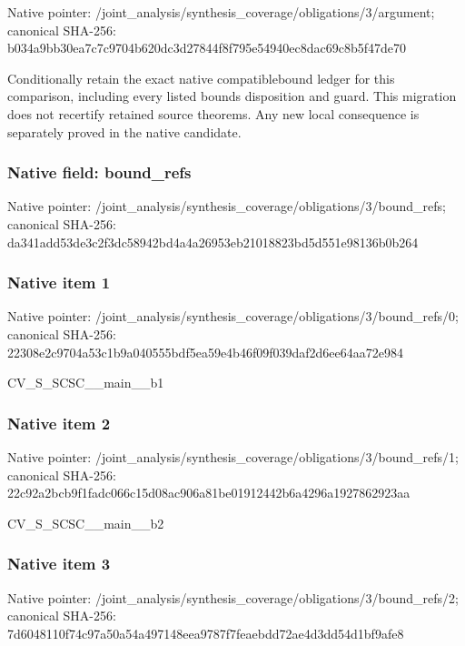 \documentclass[10pt,a4paper]{article}
\begin{document}
Native pointer: /joint\_analysis/synthesi\allowbreak{}s\_coverage/obligations/3\allowbreak{}/argument; canonical SHA-256: b034a9bb30ea7c7c9704b620\allowbreak{}dc3d27844f8f795e54940ec8\allowbreak{}dac69c8b5f47de70


Conditionally retain the exact native compatiblebound ledger for this comparison, including every listed bounds disposition and guard. This migration does not recertify retained source theorems. Any new local consequence is separately proved in the native candidate.


\subsubsection{Native field: bound\_refs}


Native pointer: /joint\_analysis/synthesi\allowbreak{}s\_coverage/obligations/3\allowbreak{}/bound\_refs; canonical SHA-256: da341add53de3c2f3dc58942\allowbreak{}bd4a4a26953eb21018823bd5\allowbreak{}d551e98136b0b264



\subsubsection{Native item 1}


Native pointer: /joint\_analysis/synthesi\allowbreak{}s\_coverage/obligations/3\allowbreak{}/bound\_refs/0; canonical SHA-256: 22308e2c9704a53c1b9a0405\allowbreak{}55bdf5ea59e4b46f09f039da\allowbreak{}f2d6ee64aa72e984


CV\_S\_SCSC\_\_main\_\_b1


\subsubsection{Native item 2}


Native pointer: /joint\_analysis/synthesi\allowbreak{}s\_coverage/obligations/3\allowbreak{}/bound\_refs/1; canonical SHA-256: 22c92a2bcb9f1fadc066c15d\allowbreak{}08ac906a81be01912442b6a4\allowbreak{}296a1927862923aa


CV\_S\_SCSC\_\_main\_\_b2


\subsubsection{Native item 3}


Native pointer: /joint\_analysis/synthesi\allowbreak{}s\_coverage/obligations/3\allowbreak{}/bound\_refs/2; canonical SHA-256: 7d6048110f74c97a50a54a49\allowbreak{}7148eea9787f7feaebdd72ae\allowbreak{}4d3dd54d1bf9afe8
\end{document}
